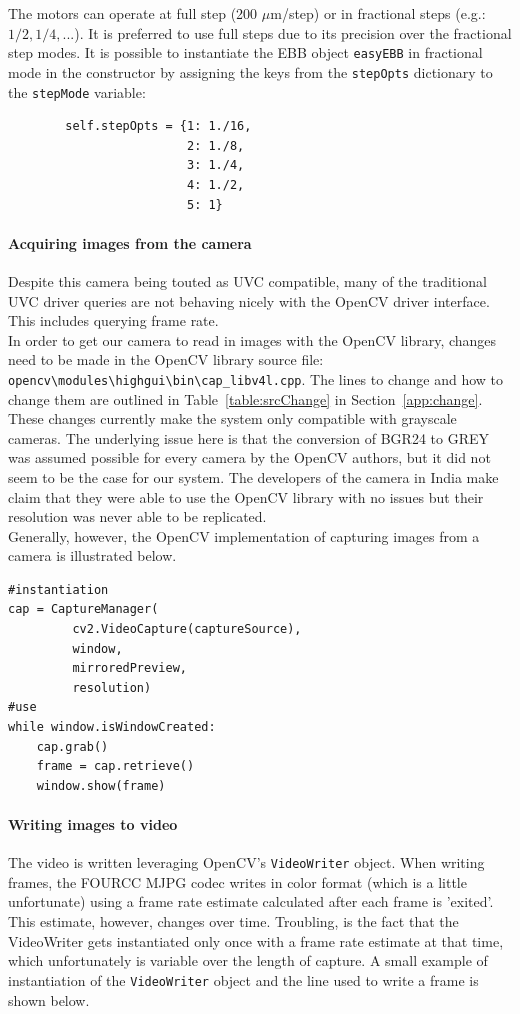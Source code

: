 \documentclass[main.tex]{subfiles}
\begin{document}
 The motors can operate at full step (200 $\mu$m/step) or in fractional steps (e.g.: $1/2, 1/4, ...$). It is preferred to use full steps due to its precision over the fractional step modes. It is possible to instantiate the EBB object \verb|easyEBB| in fractional mode in the constructor by assigning the keys from the \verb|stepOpts| dictionary to the \verb|stepMode| variable:
\begin{verbatim}
        self.stepOpts = {1: 1./16, 
                         2: 1./8, 
                         3: 1./4, 
                         4: 1./2, 
                         5: 1}
\end{verbatim}

\paragraph{Acquiring images from the camera}
\label{p:Camera}
Despite this camera being touted as UVC compatible, many of the traditional UVC driver queries are not behaving nicely with the OpenCV driver interface. This includes querying frame rate.\\

In order to get our camera to read in images with the OpenCV library, changes need to be made in the OpenCV library source file: \verb|opencv\modules\highgui\bin\cap_libv4l.cpp|. The lines to change and how to change them are outlined in Table~\ref{table:srcChange} in Section~\ref{app:change}. These changes currently make the system only compatible with grayscale cameras. The underlying issue here is that the conversion of BGR24 to GREY was assumed possible for every camera by the OpenCV authors, but it did not seem to be the case for our system. The developers of the camera in India make claim that they were able to use the OpenCV library with no issues but their resolution was never able to be replicated.\\

Generally, however, the OpenCV implementation of capturing images from a camera is illustrated below. \\
\begin{lstlisting} 
#instantiation
cap = CaptureManager( 
         cv2.VideoCapture(captureSource), 
         window, 
         mirroredPreview, 
         resolution)
#use
while window.isWindowCreated:
    cap.grab()
    frame = cap.retrieve()
    window.show(frame)
\end{lstlisting}

\paragraph{Writing images to video}
The video is written leveraging OpenCV's \verb|VideoWriter| object. When writing frames, the  FOURCC MJPG codec writes in color format (which is a little unfortunate) using a frame rate estimate calculated after each frame is 'exited'. This estimate, however, changes over time. Troubling, is the fact that the VideoWriter gets instantiated only once with a frame rate estimate at that time, which unfortunately is variable over the length of capture. A small example of instantiation of the \verb|VideoWriter| object and the line used to write a frame is shown below. \\
\end{document}
